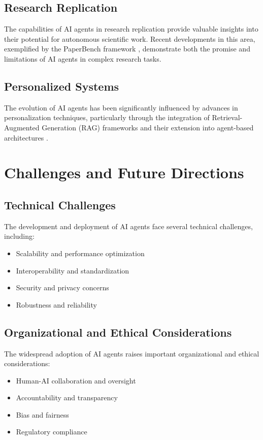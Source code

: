 \documentclass[conference]{IEEEtran}
\begin{document}
\subsection{Research Replication}
The capabilities of AI agents in research replication provide valuable insights into their potential for autonomous scientific work. Recent developments in this area, exemplified by the PaperBench framework \cite{starace2025paperbench}, demonstrate both the promise and limitations of AI agents in complex research tasks.

\subsection{Personalized Systems}
The evolution of AI agents has been significantly influenced by advances in personalization techniques, particularly through the integration of Retrieval-Augmented Generation (RAG) frameworks and their extension into agent-based architectures \cite{li2024survey}.

\section{Challenges and Future Directions}
\subsection{Technical Challenges}
The development and deployment of AI agents face several technical challenges, including:
\begin{itemize}
\item Scalability and performance optimization
\item Interoperability and standardization
\item Security and privacy concerns
\item Robustness and reliability
\end{itemize}

\subsection{Organizational and Ethical Considerations}
The widespread adoption of AI agents raises important organizational and ethical considerations:
\begin{itemize}
\item Human-AI collaboration and oversight
\item Accountability and transparency
\item Bias and fairness
\item Regulatory compliance
\end{itemize}
\end{document}
